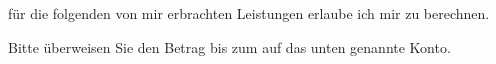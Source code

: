 \documentclass[a4paper,12pt]{scrlttr2}
\begin{document}
\begin{letter}{%
}
\opening{%
}
für die folgenden von mir erbrachten Leistungen erlaube ich mir %
 zu berechnen.


Bitte überweisen Sie den Betrag bis zum %
 auf das unten genannte Konto.
\closing{%
}


\end{letter}
\end{document}
